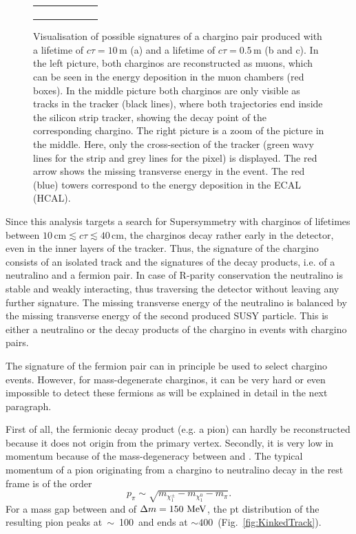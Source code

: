 \begin{figure}[!b]
\begin{tabular}{c}
\begin{subfigure}{0.31\textwidth}
      \caption{}
  \end{subfigure} 
  \end{tabular}
  \caption{Visualisation of possible signatures of a chargino pair produced with a lifetime of $c\tau = 10\,\text{m}$ (a) and a lifetime of $c\tau = 0.5\,\text{m}$ (b and c). 
           In the left picture, both charginos are reconstructed as muons, which can be seen in the energy deposition in the muon chambers (red boxes). 
           In the middle picture both charginos are only visible as tracks in the tracker (black lines), where both trajectories end inside the silicon strip tracker, showing the decay point of the corresponding chargino. 
           The right picture is a zoom of the picture in the middle. Here, only the cross-section of the tracker (green wavy lines for the strip and grey lines for the pixel) is displayed. The red arrow shows the missing transverse energy in the event.
           The red (blue) towers correspond to the energy deposition in the ECAL (HCAL).} 
  \label{fig:CharginoPaiEventDisplay}
\vspace{10pt}
\end{figure}

Since this analysis targets a search for Supersymmetry with charginos of lifetimes between $10\,\text{cm} \lesssim c\tau \lesssim  40\,\text{cm}$, the charginos decay rather early in the detector, even in the inner layers of the tracker. 
Thus, the signature of the chargino consists of an isolated track and the signatures of the decay products, i.e. of a neutralino and a fermion pair. 
In case of R-parity conservation the neutralino is stable and weakly interacting, thus traversing the detector without leaving any further signature.
The missing transverse energy of the neutralino is balanced by the missing transverse energy of the second produced SUSY particle.
This is either a neutralino or the decay products of the chargino in events with chargino pairs. 

The signature of the fermion pair can in principle be used to select chargino events. 
However, for mass-degenerate charginos, it can be very hard or even impossible to detect these fermions as will be explained in detail in the next paragraph.

First of all, the fermionic decay product (e.g. a pion) can hardly be reconstructed because it does not origin from the primary vertex.
Secondly, it is very low in momentum because of the mass-degeneracy between \chipm and \chiO.
The typical momentum of a pion originating from a chargino to neutralino decay in the \chipm rest frame is of the order 
\begin{equation*}
p_{\pi}\sim \sqrt{m_{\chi^{\pm}_1}-m_{\chi^{0}_1}-m_{\pi}}.
\end{equation*}
For a mass gap between \chipm and \chiO of $\Delta m=150\, \,\text{Me}\kern-0.06667em\text{V}$, the pt distribution of the resulting pion peaks \mbox{at $\sim$ 100\,\mev} and ends at \mbox{\pt $\sim 400\,$\mev} (Fig.~\ref{fig:KinkedTrack}).

